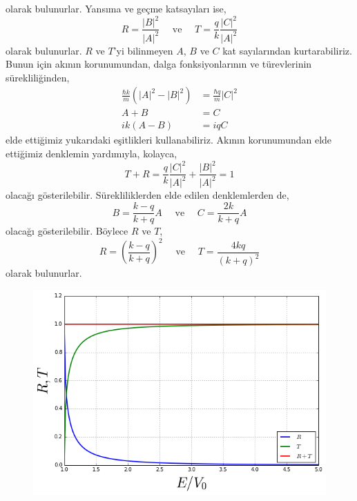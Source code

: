 \documentclass[a4paper,12pt, twoside]{article}
\begin{document}
olarak bulunurlar. Yansıma ve geçme katsayıları ise,
\begin{equation}
R =  \frac{|B|^2}{|A|^2} \quad \text{ ve } \quad
T =  \frac{q}{k} \frac{|C|^2}{|A|^2}
\end{equation}
olarak bulunurlar. $R$ ve $T$'yi bilinmeyen $A$, $B$ ve $C$ kat sayılarından
kurtarabiliriz. Bunun için akının korunumundan, dalga fonksiyonlarının ve türevlerinin sürekliliğinden,
\begin{align}
\frac { \hbar k } { m } \left( | A | ^ { 2 }  - | B | ^ { 2 } \right) &= \frac { \hbar q } { m } | C | ^ { 2 }\\
A + B  &= C \\
i k ( A - B ) &= i q C
\end{align}
elde ettiğimiz yukarıdaki eşitlikleri kullanabiliriz. Akının korunumundan elde ettiğimiz denklemin yardımıyla, kolayca,
\begin{equation}
T + R =  \frac{q}{k} \frac{|C|^2}{|A|^2} + \frac{|B|^2}{|A|^2} = 1
\end{equation}
olacağı gösterilebilir. Sürekliliklerden elde edilen denklemlerden de,
\begin{equation}
B =  \frac{k-q}{k+q} A \quad \text{ ve } \quad
C =  \frac{2k}{k+q} A
\end{equation}
olacağı gösterilebilir. Böylece $R$ ve $T$,
\begin{equation}
R =  \left(\frac{k-q}{k+q}\right)^2  \quad \text{ ve } \quad
T =  \frac{4kq}{(k+q)^2}
\end{equation}
olarak bulunurlar.

\begin{figure}[!hbtp]
	\centering
	\includegraphics[width=0.7\linewidth]{figurler/Basamak_Potansiyeli_TR_EV0_grafigi}
	\caption{}
	\label{fig:basamakpotansiyelitrev0grafigi}
\end{figure}
\end{document}

